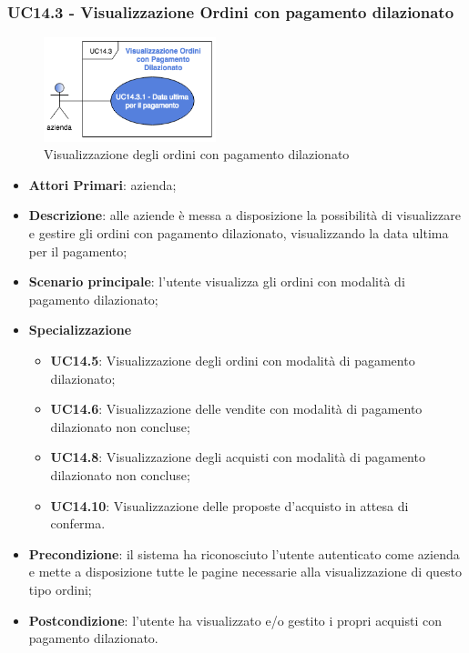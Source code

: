 \subsubsection{UC14.3 - Visualizzazione Ordini con pagamento dilazionato}
\begin{figure}[H]
	\includegraphics[width=5cm]{res/images/UC14-3.png}
	\centering
	\caption{Visualizzazione degli ordini con pagamento dilazionato}
\end{figure}
\begin{itemize}
	\item \textbf{Attori Primari}: azienda;
	\item \textbf{Descrizione}: alle aziende è messa a disposizione la possibilità di visualizzare e gestire gli ordini con pagamento dilazionato, visualizzando la data ultima per il pagamento;
	\item \textbf{Scenario principale}: l'utente visualizza gli ordini con modalità di pagamento dilazionato;
			\item \textbf{Specializzazione}
	\begin{itemize}
		\item \textbf{UC14.5}: Visualizzazione degli ordini con modalità di pagamento dilazionato;
		\item \textbf{UC14.6}: Visualizzazione delle vendite con modalità di pagamento dilazionato non concluse;
		\item \textbf{UC14.8}: Visualizzazione degli acquisti con modalità di pagamento dilazionato non concluse;
		\item \textbf{UC14.10}: Visualizzazione delle proposte d'acquisto in attesa di conferma.
	\end{itemize}
	\item \textbf{Precondizione}: il sistema ha riconosciuto l'utente autenticato come azienda e mette a disposizione tutte le pagine necessarie alla visualizzazione di questo tipo ordini;
	\item \textbf{Postcondizione}: l'utente ha visualizzato e/o gestito i propri acquisti con pagamento dilazionato.
\end{itemize} 

